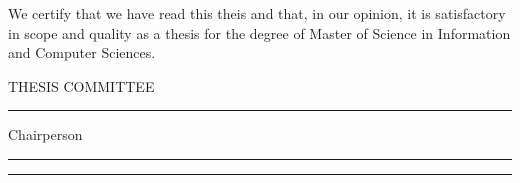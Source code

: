 
%


\newpage

\par\vspace*{1.0in}


\noindent We certify that we have read this theis and that, in our
opinion, it is satisfactory in scope and quality as a thesis for the
degree of Master of Science in Information and Computer Sciences.

\vspace*{0.8in}

\begin{flushright}

THESIS COMMITTEE\ \ \ \ \ \ 

\vspace{0.2in}

\rule{2.2in}{.01in}

\end{flushright}

\hspace{4.1in} Chairperson

\begin{flushright}
\rule{2.2in}{.01in}
\end{flushright}

\begin{flushright}
\vspace{0.15in}
\rule{2.2in}{.01in}
\end{flushright}
\vfill


%

